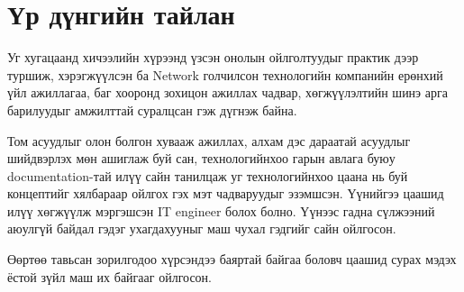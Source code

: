 \section{Үр дүнгийн тайлан}

Уг хугацаанд хичээлийн хүрээнд үзсэн онолын ойлголтуудыг практик дээр туршиж, хэрэгжүүлсэн ба Network голчилсон технологийн компанийн ерөнхий үйл ажиллагаа, баг хооронд зохицон ажиллах чадвар, хөгжүүлэлтийн шинэ арга барилуудыг амжилттай суралцсан гэж дүгнэж байна.

\quad Том асуудлыг олон болгон хувааж ажиллах, алхам дэс дараатай асуудлыг шийдвэрлэх мөн ашиглаж буй сан, технологийнхоо гарын авлага буюу documentation-тай илүү сайн танилцаж уг технологийнхоо цаана нь буй концептийг хялбараар ойлгох гэх мэт чадваруудыг эзэмшсэн. Үүнийгээ цаашид илүү хөгжүүлж мэргэшсэн IT engineer болох болно. Үүнээс гадна сүлжээний аюулгүй байдал гэдэг ухагдахууныг маш чухал гэдгийг сайн ойлгосон. 

\quad Өөртөө тавьсан зорилгодоо хүрсэндээ баяртай байгаа боловч цаашид сурах мэдэх ёстой зүйл маш их байгааг ойлгосон.